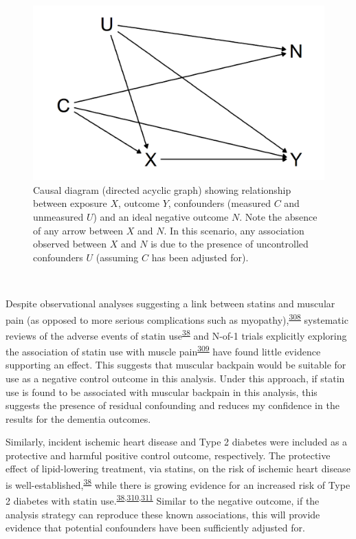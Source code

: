 \documentclass[a4paper, twoside]{templates/ociamthesis}
\begin{document}
\begin{figure}[H]

{\centering \includegraphics[width=0.8\linewidth]{figures/cprd-analysis/negativeOutcome} 

}

\caption[Causal diagram for ideal negative outcome]{Causal diagram (directed acyclic graph) showing relationship between exposure \(X\), outcome \(Y\), confounders (measured \(C\) and unmeasured \(U\)) and an ideal negative outcome \(N\). Note the absence of any arrow between \(X\) and \(N\). In this scenario, any association observed between \(X\) and \(N\) is due to the presence of uncontrolled confounders \(U\) (assuming \(C\) has been adjusted for).}\label{fig:negativeOutcome}
\end{figure}

~

Despite observational analyses suggesting a link between statins and muscular pain (as opposed to more serious complications such as myopathy),\textsuperscript{\protect\hyperlink{ref-selva-ocallaghan2018}{308}} systematic reviews of the adverse events of statin use\textsuperscript{\protect\hyperlink{ref-collins2016}{38}} and N-of-1 trials explicitly exploring the association of statin use with muscle pain\textsuperscript{\protect\hyperlink{ref-herrett2021}{309}} have found little evidence supporting an effect. This suggests that muscular backpain would be suitable for use as a negative control outcome in this analysis. Under this approach, if statin use is found to be associated with muscular backpain in this analysis, this suggests the presence of residual confounding and reduces my confidence in the results for the dementia outcomes.

Similarly, incident ischemic heart disease and Type 2 diabetes were included as a protective and harmful positive control outcome, respectively. The protective effect of lipid-lowering treatment, via statins, on the risk of ischemic heart disease is well-established,\textsuperscript{\protect\hyperlink{ref-collins2016}{38}} while there is growing evidence for an increased risk of Type 2 diabetes with statin use.\textsuperscript{\protect\hyperlink{ref-collins2016}{38},\protect\hyperlink{ref-macedo2014}{310},\protect\hyperlink{ref-smit2020}{311}} Similar to the negative outcome, if the analysis strategy can reproduce these known associations, this will provide evidence that potential confounders have been sufficiently adjusted for.
\end{document}
